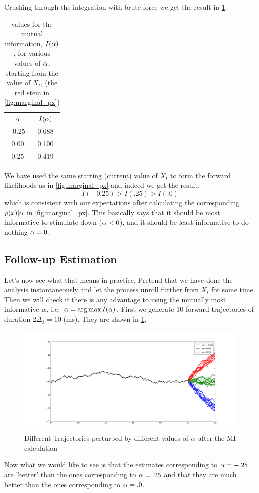 Crushing through the integration with brute force we get the result
in \cref{tab:MI_3alphas_basic_quad}.
\begin{table}
\begin{centering}
\begin{tabular}{cc}
$\alpha$& $I(\alpha)$ \\
-0.25  &
 0.688 
\\
0.00 &
   0.100 
\\
   0.25 &
   0.419 
\end{tabular}
\caption{values for the mutual information, $I(\alpha)$, for various values of
$\alpha$, starting from the value of $X_t$, (the red stem in
\cref{fig:marginal_px})}
\label{tab:MI_3alphas_basic_quad}
\end{centering}
\end{table}
We have used the same starting (current) value of $X_t$ to form the forward
likelihoods as in \cref{fig:marginal_px} and indeed we get the result.
$$I(-0.25) >I (.25) > I(.0)$$
which is consistent with our expectations after calculating the corresponding
$p(x)|\alpha$ in \cref{fig:marginal_px}. This basically says that it should be most
informative to stimulate down ($\alpha<0$), and it should be least informative to
do nothing $\alpha=0$.

 \subsection{Follow-up Estimation}
 Let's now see what that means in practice. Pretend that we have done the
 analysis instantaneously and let the process unroll further from $X_t$ for
some time. Then we will check if there is any advantage to
 using the mutually most informative $\alpha$, i.e.\ $\a = \argmax I(\a)$.
First we generate 10 forward trajectories of duration 2$\Delta_f = 10$ (ms).
They are shown in \cref{fig:perturbed_trajectories}. 
\begin{figure}[htp]
\begin{center}
  \includegraphics[width=1\textwidth]{Figs/MIML/forward_sims.pdf}
  \caption[labelInTOC]{Different Trajectories perturbed by different values of
  $\alpha$ after the MI calculation}
  \label{fig:perturbed_trajectories}
\end{center}
\end{figure}
% 
Now what we would like to see is that the estimates corresponding to $\alpha=-.25$
are 'better' than the ones corresponding to $\alpha=.25$ and that they are much
better than the ones corresponding to $\alpha=.0$.

